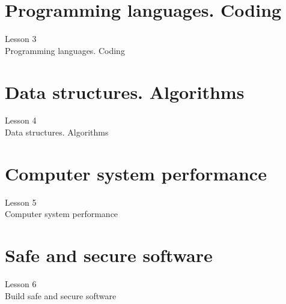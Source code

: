 \documentclass[aspectratio=1610]{beamer}
\begin{document}
\section{Programming languages. Coding}

\begin{frame}
\begin{center}
\Huge Lesson 3\\
Programming languages. Coding
\end{center}
\end{frame}




\section{Data structures. Algorithms}


\begin{frame}
\begin{center}
\Huge Lesson 4\\
Data structures. Algorithms
\end{center}
\end{frame}




\section{Computer system performance}
\begin{frame}
\begin{center}
\Huge Lesson 5\\
Computer system performance
\end{center}
\end{frame}



\section{Safe and secure software}
\begin{frame}
\begin{center}
\Huge Lesson 6\\
Build safe and secure software
\end{center}
\end{frame}
\end{document}
